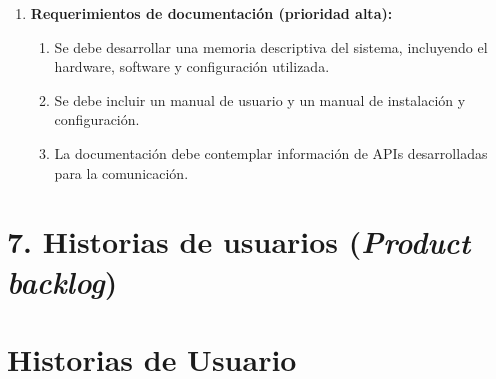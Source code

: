 \documentclass[
11pt, %
]{charter}
\begin{document}
\begin{enumerate}
    \item \textbf{Requerimientos de documentación (prioridad alta):}
    \begin{enumerate}
        \item Se debe desarrollar una memoria descriptiva del sistema, incluyendo el hardware, software y configuración utilizada.
        \item Se debe incluir un manual de usuario y un manual de instalación y configuración. 
        \item La documentación debe contemplar información de APIs desarrolladas para la comunicación. 
    \end{enumerate}

\end{enumerate}




\section{7. Historias de usuarios (\textit{Product backlog})}
\label{sec:backlog}

\section{Historias de Usuario}
\end{document}
